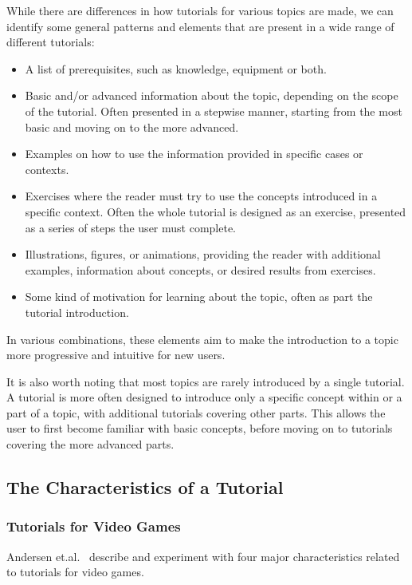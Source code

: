 \noindent
While there are differences in how tutorials for various topics are made, we can identify some general patterns and elements that are present in a wide range of different tutorials:
\begin{itemize}
	\item A list of prerequisites, such as knowledge, equipment or both.
	\item Basic and/or advanced information about the topic, depending on the scope of the tutorial. Often presented in a stepwise manner, starting from the most basic and moving on to the more advanced.
	\item Examples on how to use the information provided in specific cases or contexts.
	\item Exercises where the reader must try to use the concepts introduced in a specific context. Often the whole tutorial is designed as an exercise, presented as a series of steps the user must complete.
	\item Illustrations, figures, or animations, providing the reader with additional examples, information about concepts, or desired results from exercises.
	\item Some kind of motivation for learning about the topic, often as part the tutorial introduction.
\end{itemize}

\noindent
In various combinations, these elements aim to make the introduction to a topic more progressive and intuitive for new users.

\noindent
It is also worth noting that most topics are rarely introduced by a single tutorial. A tutorial is more often designed to introduce only a specific concept within or a part of a topic, with additional tutorials covering other parts. This allows the user to first become familiar with basic concepts, before moving on to tutorials covering the more advanced parts.

\subsection{The Characteristics of a Tutorial}
\label{sec:tutorial_characteristics}




\subsubsection{Tutorials for Video Games}
Andersen et.al.~\cite{andersen:tutorials_impact} describe and experiment with four major characteristics related to tutorials for video games.

